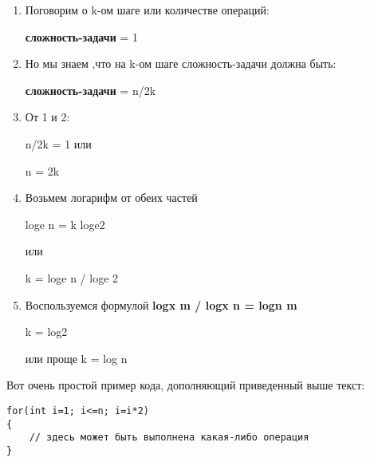 \begin{enumerate}
    \item Поговорим о k-ом шаге или количестве операций:
    
    \vspace{\baselineskip}
    \textbf{сложность-задачи} = 1
    
    \item Но мы знаем ,что на k-ом шаге сложность-задачи должна быть:
    
    \vspace{\baselineskip}
    \textbf{сложность-задачи} = n/2k
    
    \item От 1 и 2:
    
    \vspace{\baselineskip}
    n/2k = 1 или
    
    \vspace{\baselineskip}
    n = 2k
    
    \item Возьмем логарифм от обеих частей
    
    \vspace{\baselineskip}
    loge n = k loge2
    
    \vspace{\baselineskip}
    или
    
    \vspace{\baselineskip}
    k = loge n / loge 2
    
    \item Воспользуемся формулой \textbf{logx m / logx n = logn m}
    
    \vspace{\baselineskip}
    k = log2
    
    \vspace{\baselineskip}
    или проще  k = log n
\end{enumerate}

\vspace{\baselineskip}

\vspace{\baselineskip}
Вот очень простой пример кода, дополняющий приведенный выше текст:

\vspace{\baselineskip}
\begin{tcolorbox}
\begin{verbatim}
for(int i=1; i<=n; i=i*2)
{
	// здесь может быть выполнена какая-либо операция
}
\end{verbatim}
\end{tcolorbox}

